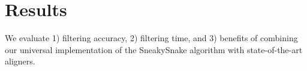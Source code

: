 \section{Results} \label{sec:results}
{We} evaluate 1) filtering accuracy, 2) filtering time, and 3) benefits of combining our universal implementation of the SneakySnake algorithm with state-of-the-art aligners.
